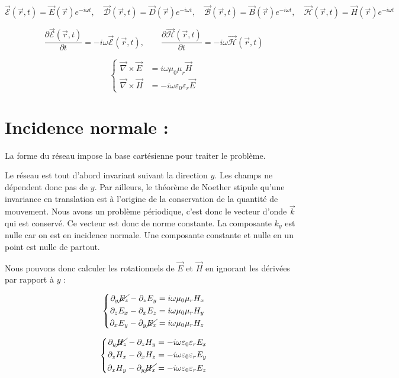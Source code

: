 \documentclass{article}
\begin{document}
\[
\vec{\mathcal{E}}(\vec{r}, t) = \vec{E}(\vec{r}) e^{-i \omega t}, \quad
\vec{\mathcal{D}}(\vec{r}, t) = \vec{D}(\vec{r}) e^{-i \omega t}, \quad
\vec{\mathcal{B}}(\vec{r}, t) = \vec{B}(\vec{r}) e^{-i \omega t}, \quad
\vec{\mathcal{H}}(\vec{r}, t) = \vec{H}(\vec{r}) e^{-i \omega t}
\]

\[
\frac{\partial \vec{\mathcal{E}}(\vec{r}, t)}{\partial t} = -i \omega \vec{\mathcal{E}}(\vec{r}, t), \qquad
\frac{\partial \vec{\mathcal{H}}(\vec{r}, t)}{\partial t} = -i \omega \vec{\mathcal{H}}(\vec{r}, t)
\]

\[
\left\{
\begin{aligned}
\vec{\nabla} \times \vec{E} &= i \omega \mu_0 \mu_r \vec{H} \\
\vec{\nabla} \times \vec{H} &= - i \omega \varepsilon_0 \varepsilon_r \vec{E}
\end{aligned}
\right.
\]
\section*{Incidence normale : }
La forme du réseau impose la base cartésienne pour traiter le problème.

Le réseau est tout d'abord invariant suivant la direction \(y\). Les champs ne dépendent donc pas de \(y\). Par ailleurs, le théorème de Noether stipule qu'une invariance en translation est à l'origine de la conservation de la quantité de mouvement. Nous avons un problème périodique, c'est donc le vecteur d'onde \(\vec{k}\) qui est conservé. Ce vecteur est donc de norme constante. La composante \(k_y\) est nulle car on est en incidence normale. Une composante constante et nulle en un point est nulle de partout.

Nous pouvons donc calculer les rotationnels de \(\vec{E}\) et \(\vec{H}\) en ignorant les dérivées par rapport à \(y\) :

\[
\left\{
\begin{aligned}
\partial_y \cancel{E_z} - \partial_z E_y &= i \omega \mu_0 \mu_r H_x \\
\partial_z E_x - \partial_x E_z &= i \omega \mu_0 \mu_r H_y \\
\partial_x E_y - \partial_y \cancel{E_x} &= i \omega \mu_0 \mu_r H_z
\end{aligned}
\right.
\]

\[
\left\{
\begin{aligned}
\partial_y \cancel{H_z} - \partial_z H_y &= -i \omega \varepsilon_0 \varepsilon_r E_x \\
\partial_z H_x - \partial_x H_z &= -i \omega \varepsilon_0 \varepsilon_r E_y \\
\partial_x H_y - \partial_y \cancel{H_x} &= -i \omega \varepsilon_0 \varepsilon_r E_z
\end{aligned}
\right.
\]
\end{document}
